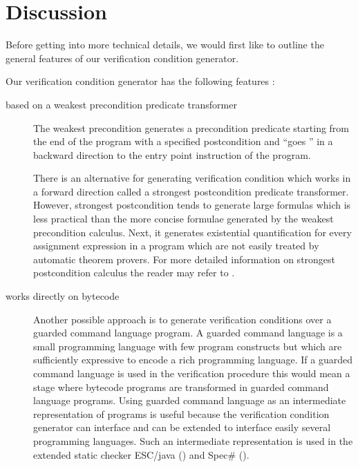 \section{Discussion}\label{wp:discussionVC}


Before getting into more technical details, we would first like
to outline the general features of our verification condition
generator. 


Our verification condition generator has the following features :

\begin{description}
  \item [based on a weakest precondition predicate transformer] 
        The weakest precondition generates a precondition predicate starting 
	from the end of the program with a specified postcondition and ``goes '' in a backward
	direction to the entry point instruction of the program. 
	
	There is an alternative for generating
	verification condition  which works in a forward direction called a strongest postcondition
	predicate transformer. However, strongest postcondition tends to generate large formulas which is less practical than the more concise
	formulae generated by the  weakest precondition calculus.
	Next, it generates existential quantification for every assignment expression in a program which
	are not easily treated by automatic theorem provers.  
	For more detailed information on strongest postcondition calculus the reader may refer to  \cite{WPCDS}.
 
  \item [works directly on bytecode] 
        Another possible approach is to generate verification conditions over a guarded command language program.
	A guarded command language is a small programming language with few program constructs but which are 
	sufficiently expressive to encode a rich programming language. 
	If a guarded command language is used in the verification procedure this would mean 
	a stage where  bytecode programs are transformed in guarded command language programs.
	Using guarded command language as an intermediate representation of programs
	is useful because the verification condition generator can interface and can be extended to interface 
	easily several programming languages. 
	Such an intermediate representation is used in the extended static checker
	ESC/java (\cite{escjava}) and Spec\# (\cite{BLS04sp}). 
	

\end{description}

